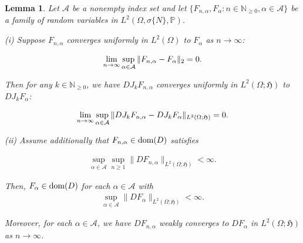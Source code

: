 \documentclass[letterpaper, 11pt,  reqno]{amsart}
\newtheorem{lemma}[theorem]{Lemma}
\newcommand{\noi}{\noindent}
\newcommand{\al}{\alpha}
\newcommand{\s}{\sigma}
\renewcommand{\O}{\Omega}
\newcommand{\PP}{\mathbb{P}}
\newcommand{\N}{\mathbb{N}}
\newcommand{\fH}{\mathfrak{H}}
\newcommand{\dom}{\textup{dom}}
\numberwithin{equation}{section}
\numberwithin{theorem}{section}
\begin{document}
\begin{lemma} \label{lem_1}
Let $\mathcal{A}$ be a nonempty index set and let $\{F_{n, \al}, F_\al : n\in\N_{\geq 0}, \al\in\mathcal{A}\}$
be a family of random variables in $L^2(\O,\s\{N\}, \PP)$.

{\rm (i)}
Suppose $F_{n,\al}$ converges uniformly in $L^2(\O)$ to $F_\al$  as $n\to\infty$:

\noi
\begin{align}  \notag%
\lim_{n\to\infty}\sup_{\al\in \mathcal{A}} \| F_{n,\al} - F_\al \|_2  = 0.
\end{align}


\noi
 Then for any $k\in\N_{\geq 0}$,
we have  $D J_k F_{n,\al}$   converges uniformly 
in $L^2(\O; \fH)$ to $DJ_k F_\al$:


\noi
\begin{align}   \notag%
\lim_{n\to\infty}\sup_{\al\in \mathcal{A}} \| DJ_k F_{n,\al} - DJ_k F_\al \|_{L^2(\O;\fH)}  = 0.
\end{align}

\smallskip
\noi
{\rm (ii)} 
Assume additionally that  $F_{n,\al}\in\dom(D)$ satisfies 

\noi
\begin{align}\label{MDB1}
\sup_{\al\in\mathcal{A}} \sup_{n\geq 1} \| DF_{n, \al}\|_{L^2(\O;\fH)} <\infty. 
\end{align}

\noi
Then, $F_\al\in\dom(D)$ for each $\al\in\mathcal{A}$ 
with
\begin{align}\label{MDB1b}
\sup_{\al\in\mathcal{A}}  \| DF_{\al}\|_{L^2(\O;\fH)} <\infty. 
\end{align}

\noi
 Moreover, for each $\al\in\mathcal{A}$,
 we have  $DF_{n,\al}$ weakly converges to $DF_\al$ in $L^2(\O;\fH)$
as $n\to\infty$. 

\end{lemma}
\end{document}
